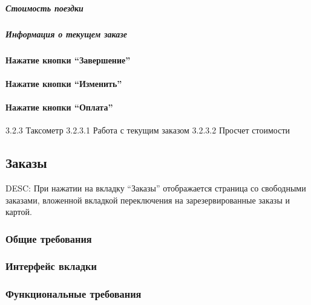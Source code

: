         \subparagraph{Стоимость поездки} \label{taximeter_functional_drive_costs}

        \subparagraph{Информация о текущем заказе} \label{taximeter_functional_curr_order_info}

      \paragraph{Нажатие кнопки “Завершение”} \label{taximeter_functional_end_button}

      \paragraph{Нажатие кнопки “Изменить”} \label{taximeter_functional_change_button}

      \paragraph{Нажатие кнопки “Оплата”} \label{taximeter_functional_checkout_button}

    3.2.3 Таксометр
    3.2.3.1 Работа с текущим заказом
    3.2.3.2 Просчет стоимости

  \subsection{Заказы} \label{driver_app_orders_tab}

    DESC: При нажатии на вкладку “Заказы” отображается страница со свободными заказами, вложенной вкладкой переключения на зарезервированные заказы и картой.

    \subsubsection{Общие требования}

    \subsubsection{Интерфейс вкладки}

    \subsubsection{Функциональные требования}

